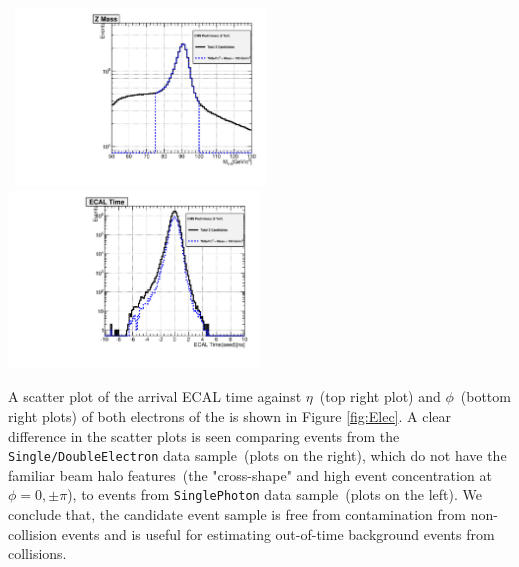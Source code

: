\vspace{5mm}
\begin{minipage}{0.90\linewidth} 
\begin{center}
\mbox{
\includegraphics[height=0.55\textwidth, width=0.5\textwidth]{THESISPLOTS/Z-CandidateOverLay-SignalMass.pdf} \quad
\includegraphics[height=0.55\textwidth, width=0.5\textwidth]{THESISPLOTS/Z-CandidateOverLay-SignalTime.pdf}}
\label{fig:Zmass}
\end{center}
\end{minipage}

\vspace{5mm}
A scatter plot of the arrival ECAL time against $\eta$~(top right plot) and  $\phi$~(bottom right plots) of both electrons of the \PZ is shown in Figure \ref{fig:Elec}. A clear difference in the scatter plots is seen comparing events from the \texttt{Single/DoubleElectron} data sample~(plots on the right), which do not have the familiar beam halo features~(the "cross-shape" and high event concentration at $\phi = 0,\pm \pi$), to events from \texttt{SinglePhoton} data sample~(plots on the left). 
We conclude that, the candidate \PZ event sample is free from contamination from non-collision events and is useful for estimating out-of-time background events from collisions.

